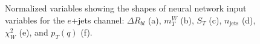 \begin{figure}[h!]
\vspace{-4.5mm}
\hfil
{}
\caption{Normalized variables showing the shapes of neural network input variables for the $e$+jets channel: $\Delta R_{b l}$ (a), $m_{T}^{W}$ (b), $S_T$ (c), $n_{\text{jets}}$ (d), $\chi^{2}_{W}$ (e), and $p_T (q)$ (f).}
\label{fig:VarPlotsej2}
\end{figure}


